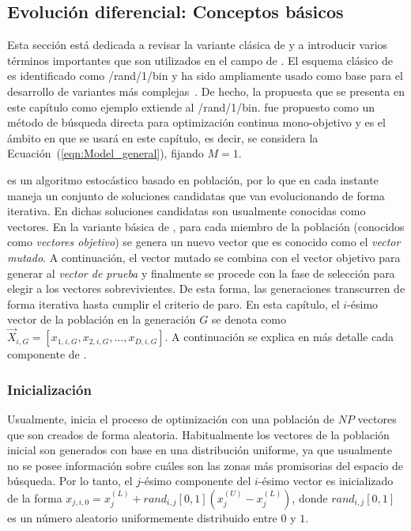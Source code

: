 \subsection{Evolución diferencial: Conceptos básicos}

Esta sección está dedicada a revisar la variante clásica de \DE{} y a introducir varios términos importantes que son utilizados 
en el campo de \DE{}.
%
El esquema clásico de \DE{} es identificado como \DE{}/rand/1/bin y ha sido ampliamente usado como base para el desarrollo de 
variantes más complejas~\cite{das2011differential}.
%
De hecho, la propuesta que se presenta en este capítulo como ejemplo extiende al \DE{}/rand/1/bin.
%
\DE{} fue propuesto como un método de búsqueda directa para optimización continua mono-objetivo y es el ámbito en que
se usará en este capítulo, es decir, se considera la Ecuación~(\ref{eqn:Model_general}), fijando $M = 1$.

\DE{} es un algoritmo estocástico basado en población, por lo que en cada instante maneja un conjunto de soluciones 
candidatas que van evolucionando de forma iterativa.
%
En \DE{} dichas soluciones candidatas son usualmente conocidas como vectores.
%
En la variante básica de \DE{}, para cada miembro de la población (conocidos como \textit{vectores objetivo}) 
se genera un nuevo vector que es conocido como el \textit{vector mutado}.
%
A continuación, el vector mutado se combina con el vector objetivo para generar al \textit{vector de prueba} y 
finalmente se procede con la fase de selección para elegir a los vectores sobrevivientes.
%
De esta forma, las generaciones transcurren de forma iterativa hasta cumplir el criterio de paro.
%
En esta capítulo, el $i$-ésimo vector de la población en la generación $G$ se denota como$\vec{X}_{i,G} = [x_{1,i,G}, x_{2,i,G},..., x_{D,i, G}]$.
%
A continuación se explica en más detalle cada componente de \DE{}.

\subsubsection{Inicialización}

Usualmente, \DE{} inicia el proceso de optimización con una población de $NP$ vectores que son creados de forma aleatoria.
%
Habitualmente los vectores de la población inicial son generados con base en una distribución uniforme, ya que usualmente no se posee 
información sobre cuáles son las zonas más promisorias del espacio de búsqueda.
%
Por lo tanto, el $j$-ésimo componente del $i$-ésimo vector es inicializado de la forma $x_{j,i,0} = x_{j}^{(L)} + rand_{i,j}[0,1] (x_{j}^{(U)} - x_{j}^{(L)})$,
donde $rand_{i,j}[0,1]$ es un número aleatorio uniformemente distribuido entre $0$ y $1$.

